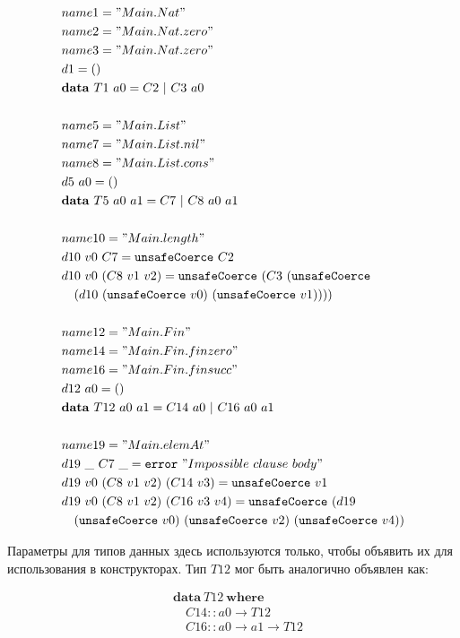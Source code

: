 \begin{align*}
&name1 = "Main.Nat"\\
&name2 = "Main.Nat.zero"\\
&name3 = "Main.Nat.zero"\\
&d1 = ()\\
&\mathbf{data}\ T1\ a0 = C2\ |\ C3\ a0\\
\\
&name5 = "Main.List"\\
&name7 = "Main.List.nil"\\
&name8 = "Main.List.cons"\\
&d5\ a0 = ()\\
&\mathbf{data}\ T5\ a0\ a1 = C7\ |\ C8\ a0\ a1\\
\\
&name10 = "Main.length"\\
&d10\ v0\ C7 = \texttt{unsafeCoerce}\ C2\\
&d10\ v0\ (C8\ v1\ v2) = \texttt{unsafeCoerce}\ (C3\ (\texttt{unsafeCoerce}\\
&\quad(d10\ (\texttt{unsafeCoerce}\ v0)\ (\texttt{unsafeCoerce}\ v1))))\\
\\
&name12 = "Main.Fin"\\
&name14 = "Main.Fin.finzero"\\
&name16 = "Main.Fin.finsucc"\\
&d12\ a0 = ()\\
&\mathbf{data}\ T12\ a0\ a1 = C14\ a0\ |\ C16\ a0\ a1\\
\\
&name19 = "Main.elemAt"\\
&d19\ \_\ C7\ \_ = \texttt{error}\ "Impossible\ clause\ body"\\
&d19\ v0\ (C8\ v1\ v2)\ (C14\ v3) = \texttt{unsafeCoerce}\ v1\\
&d19\ v0\ (C8\ v1\ v2)\ (C16\ v3\ v4) = \texttt{unsafeCoerce}\ (d19\\
&\quad(\texttt{unsafeCoerce}\ v0)\ (\texttt{unsafeCoerce}\ v2)\ (
   \texttt{unsafeCoerce}\ v4))
\end{align*}

Параметры для типов данных здесь используются только, чтобы объявить
их для использования в конструкторах. Тип \(T12\) мог быть аналогично объявлен как:

\begin{align*}
&\mathbf{data}\ T12\ \mathbf{where}\\
&\quad C14 :: a0 \rightarrow T12\\
&\quad C16 :: a0 \rightarrow a1 \rightarrow T12
\end{align*}

